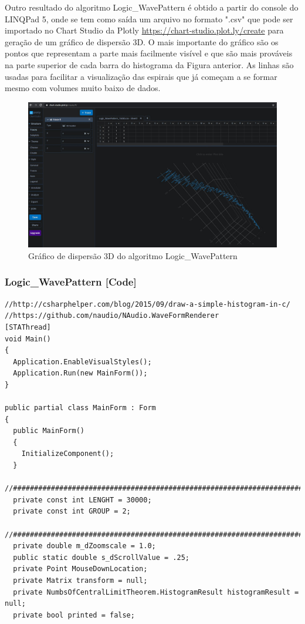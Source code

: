 \begin{apendicesenv}
Outro resultado do algoritmo Logic\_WavePattern é obtido a partir do console do LINQPad 5, onde se tem como saída um arquivo no formato ".csv" que pode ser importado no Chart Studio da Plotly \url{https://chart-studio.plot.ly/create} para geração de um gráfico de dispersão 3D. O mais importante do gráfico são os pontos que representam a parte mais facilmente visível e que são mais prováveis na parte superior de cada barra do histograma da Figura anterior. As linhas são usadas para facilitar a visualização das espirais que já começam a se formar mesmo com volumes muito baixo de dados.
	\begin{figure}[H]
	\caption{Gráfico de dispersão 3D do algoritmo Logic\_WavePattern}
	\label{fig:plotly_3DScatter}
	\centering
	\includegraphics[scale=.33]{sections/images/plotly_3DScatter.jpg}
	\end{figure}

\subsubsection*{Logic\_WavePattern [Code]}
\begin{lstlisting}
//http://csharphelper.com/blog/2015/09/draw-a-simple-histogram-in-c/
//https://github.com/naudio/NAudio.WaveFormRenderer
[STAThread]
void Main()
{
  Application.EnableVisualStyles();
  Application.Run(new MainForm());
}

public partial class MainForm : Form
{
  public MainForm()
  {
    InitializeComponent();
  }
  //###########################################################################
  private const int LENGHT = 30000;
  private const int GROUP = 2;
  //###########################################################################
  private double m_dZoomscale = 1.0;
  public static double s_dScrollValue = .25;
  private Point MouseDownLocation;
  private Matrix transform = null;
  private NumbsOfCentralLimitTheorem.HistogramResult histogramResult = null;
  private bool printed = false;


\end{lstlisting}
\end{apendicesenv}
